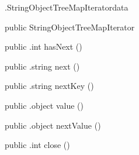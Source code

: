 \begin{CrexxClass}{.StringObjectTreeMapIterator}{data}

  \begin{Hierarchy}
  \end{Hierarchy}

  \begin{Members}

    \Factory
      {public}
      {StringObjectTreeMapIterator}
      {}

    \Method
      {public}
      {.int}
      {hasNext}
      {()}

    \Method
      {public}
      {.string}
      {next}
      {()}

    \Method
      {public}
      {.string}
      {nextKey}
      {()}

    \Method
      {public}
      {.object}
      {value}
      {()}

    \Method
      {public}
      {.object}
      {nextValue}
      {()}

    \Method
      {public}
      {.int}
      {close}
      {()}

  \end{Members}
\end{CrexxClass}

